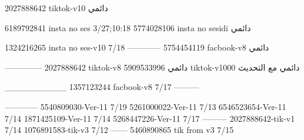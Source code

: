 2027888642 tiktok-v10
دائمي

6189792841 insta no ses
3/27;10:18
5774028106 insta no sesidi
دائمي

1324216265 insta no ses-v10
7/18
------------
5754454119 facbook-v8
دائمي


--------------
2027888642 tiktok-v8
دائمي
5909533996 tiktok-v1000
دائمي مع التحديث

__________
1357123244 facbook-v8
7/17
---------

------------
5540809030-Ver-11
7/19
5261000022-Ver-11
7/13
6546523654-Ver-11
7/14
1871425109-Ver-11
7/14
5268447226-Ver-11
7/17
---------
2027888642-tik-v1
7/14
1076891583-tik-v3
7/12
------
5460890865 tik from v3
7/15
